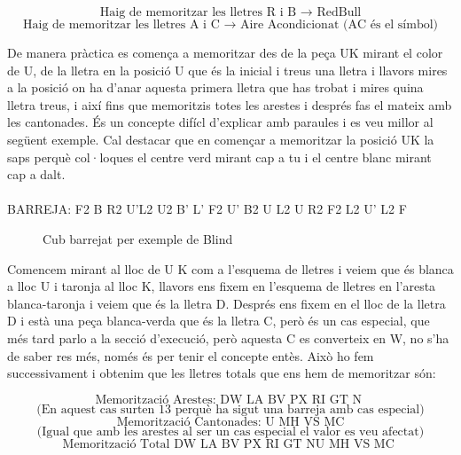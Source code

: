 $$ \textrm{Haig de memoritzar les lletres R i B    }  \rightarrow \textrm{   RedBull} $$
$$ \textrm{Haig de memoritzar les lletres A i C   }  \rightarrow \textrm{   Aire Acondicionat (AC és el símbol)} $$

\vspace{0.33cm}

De manera pràctica es comença a memoritzar des de la peça UK mirant el color de U, de la lletra en la posició U que és la inicial i treus una lletra i llavors mires a la posició on ha d'anar aquesta primera lletra que has trobat i mires quina lletra treus, i així fins que memoritzis totes les arestes i després fas el mateix amb les cantonades. És un concepte difícl d'explicar amb paraules i es veu millor al següent exemple. Cal destacar que en començar a memoritzar la posició UK la saps perquè col·loques el centre verd mirant cap a tu i el centre blanc mirant cap a dalt.
\\\\BARREJA: F2 B R2 U'L2 U2 B' L' F2 U' B2 U L2 U R2 F2 L2 U' L2 F

\begin{figure}[h!]
    \centering\RubikCubeSolvedWY
    \caption{Cub barrejat per exemple de Blind}
    \label{exemple-memo}
    \end{figure}

Comencem mirant al lloc de U K com a l'esquema de lletres i veiem que és blanca a lloc U i taronja al lloc K, llavors ens fixem en l'esquema de lletres en l'aresta blanca-taronja i veiem que és la lletra D. 
Després ens fixem en el lloc de la lletra D i està una peça blanca-verda que és la lletra C, però és un cas especial, que més tard parlo a la secció d'execució, però aquesta C es converteix en W, no s'ha de saber res més, només és per tenir el concepte entès. Això ho fem successivament i obtenim que les lletres totals que ens hem de memoritzar són:

$$ \textrm{Memorització Arestes: DW LA BV PX RI GT N } $$ $$ \textrm{(En aquest cas surten 13 perquè ha sigut una barreja amb cas especial)} $$
$$ \textrm{Memorització Cantonades: U MH VS MC} $$ $$ \textrm{(Igual que amb les arestes al ser un cas especial el valor es veu afectat)} $$
\vspace{0.17cm}
$$ \textrm{Memorització Total DW LA BV PX RI GT NU MH VS MC } $$


